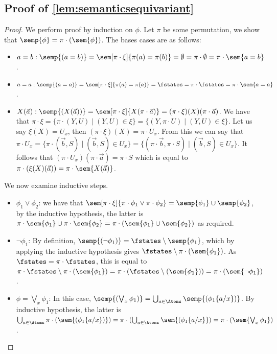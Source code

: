 \subsection{Proof of \cref{lem:semanticsequivariant}}
\semanticsequivariant*
\begin{proof}
	We perform proof by induction on $\phi$.
	Let $\pi$ be some permutation, we show that
	$\semp{\phi} = \pi\cdot(\sem{\phi})$.
	The bases cases are as follows:
	\begin{itemize}
		\item $a=b: \semp{(a=b)} = \sem[\pi\cdot \xi]{\pi(a) = \pi(b)} = \emptyset = \pi\cdot \emptyset = \pi\cdot\sem{a=b}$.
		\item $a=a: \semp{(a=a)} = \sem[\pi\cdot \xi]{\pi(a) = \pi(a)} = \fstates = \pi\cdot \fstates = \pi\cdot\sem{a=a}$.
		\item $X(\vec a): \semp{(X(\vec a))} = \sem[\pi\cdot\xi]{X(\pi\cdot \vec a)} = (\pi\cdot\xi)(X)(\pi\cdot \vec a)$.
		We have that $\pi\cdot\xi = \{\pi\cdot (Y, U)\mid (Y,U)\in \xi\} = \{(Y, \pi \cdot U)\mid (Y,U)\in \xi\}$. 
		Let us say $\xi(X) = U_x$, then $(\pi\cdot\xi)(X) = \pi\cdot U_x$. 
		From this we can say that $\pi\cdot U_x = \{\pi\cdot (\vec b, S)\mid (\vec b, S) \in U_x\}=\{(\pi\cdot \vec b, \pi\cdot S)\mid (\vec b, S) \in U_x\}$.
		It follows that $(\pi\cdot U_x)(\pi\cdot \vec a) = \pi\cdot S$
		which is equal to 
		$\pi\cdot (\xi(X)(\vec a)) = \pi\cdot \sem{X(\vec a)}$.
	\end{itemize}
	We now examine inductive steps.\
	\begin{itemize}
		\item $\phi_1 \vee \phi_2$:
		we have that $\sem[\pi\cdot \xi]{\pi\cdot \phi_1 \vee \pi\cdot \phi_2} = \semp{\phi_1} \cup \semp{\phi_2}$, by the inductive hypothesis, the latter is $\pi\cdot \sem{\phi_1} \cup \pi\cdot \sem{\phi_2}=\pi\cdot (\sem{\phi_1}\cup\sem{\phi_2})$ as required. 
		\item $\lnot \phi_1$: 
		By definition, $\semp{(\lnot\phi_1)} = \fstates\setminus\semp{\phi_1}$, which by applying the inductive hypothesis gives $\fstates\setminus\pi\cdot (\sem{\phi_1})$.
		As $\fstates = \pi\cdot \fstates$, this is equal to $\pi\cdot \fstates\setminus\pi\cdot (\sem{\phi_1})=\pi\cdot(\fstates\setminus(\sem{\phi_1}))=\pi\cdot(\sem{\lnot\phi_1})$. 
		\item $\phi=\bigvee_{x}\phi_1$:
		In this case, $\semp{(\bigvee_{x}\phi_1)} = \bigcup_{a\in\Atoms}\semp{(\phi_1\{a/x\})}$. By inductive hypothesis, the latter is $\bigcup_{a\in\Atoms}\pi\cdot (\sem{(\phi_1\{a/x\})})=\pi\cdot (\bigcup_{a\in\Atoms}\sem{(\phi_1\{a/x\}})=\pi\cdot (\sem{\bigvee_{x}\phi_1})$.

\end{itemize}
\end{proof}
